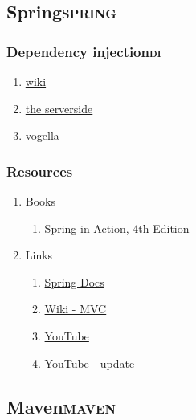 \documentclass[11pt]{article}
\begin{document}
\subsection{Spring\hfill{}\textsc{spring}}
\label{sec:org174ac20}
\subsubsection{Dependency injection\hfill{}\textsc{di}}
\label{sec:org6a551b3}
\begin{enumerate}
\item \href{https://en.wikipedia.org/wiki/dependency\_injection}{wiki}
\label{sec:org4c4284a}
\item \href{http://www.theserverside.com/news/1321158/a-beginners-guide-to-dependency-injection}{the serverside}
\label{sec:org415b8ca}
\item \href{http://www.vogella.com/tutorials/dependencyinjection/article.html}{vogella}
\label{sec:org0c17aa7}
\end{enumerate}
\subsubsection{Resources}
\label{sec:org7b0978b}
\begin{enumerate}
\item Books
\label{sec:org5e8a1ae}
\begin{enumerate}
\item \href{../notes/pdf/SpringInAction4thEdition.pdf::1}{Spring in Action, 4th Edition}
\label{sec:orgf520c94}
\end{enumerate}
\item Links
\label{sec:orge5dcd2d}
\begin{enumerate}
\item \href{http://docs.spring.io/spring/docs/4.0.0.RELEASE/spring-framework-reference/htmlsingle/}{Spring Docs}
\label{sec:orgad5fb44}
\item \href{https://en.wikipedia.org/wiki/Model\%E2\%80\%93view\%E2\%80\%93controller}{Wiki - MVC}
\label{sec:org4a95570}
\item \href{https://www.youtube.com/watch?v=GB8k2-Egfv0\&list=PLC97BDEFDCDD169D7}{YouTube}
\label{sec:org66fa462}
\item \href{https://www.youtube.com/watch?v=rMLP-NEPgnM}{YouTube - update}
\label{sec:org09b63a3}
\end{enumerate}
\end{enumerate}
\subsection{Maven\hfill{}\textsc{maven}}
\label{sec:org483200b}
\end{document}
